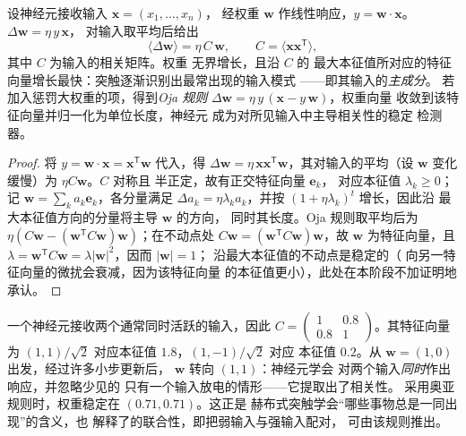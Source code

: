 \begin{theorem}[赫布突触学到什么]\label{thm:b3:learning-memory:hebb}
设神经元接收输入 $\mathbf{x} = (x_{1},\dots,x_{n})$，
经权重 $\mathbf{w}$ 作线性响应，$y = \mathbf{w}\cdot\mathbf{x}$。
 $\Delta\mathbf{w} = \eta\, y\,\mathbf{x}$，
对输入取平均后给出
\[
\langle\Delta\mathbf{w}\rangle = \eta\,C\,\mathbf{w}, \qquad C =
\langle\mathbf{x}\mathbf{x}^{\mathsf{T}}\rangle ,
\]
其中 $C$ 为输入的相关矩阵。权重
无界增长，且沿 $C$ 的
最大本征值所对应的特征向量增长最快：突触逐渐识别出最常出现的输入模式
——即其输入的\emph{主成分}。
若加入惩罚大权重的项，得到\emph{Oja 规则}
$\Delta\mathbf{w} = \eta\, y\,(\mathbf{x} - y\,\mathbf{w})$，权重向量
收敛到该特征向量并归一化为单位长度，神经元
成为对所见输入中主导相关性的稳定
检测器。
\end{theorem}
\begin{proof}
将 $y = \mathbf{w}\cdot\mathbf{x} = \mathbf{x}^{\mathsf{T}}
\mathbf{w}$ 代入，得 $\Delta\mathbf{w} = \eta\,\mathbf{x}
\mathbf{x}^{\mathsf{T}}\mathbf{w}$，其对输入的平均（设
$\mathbf{w}$ 变化缓慢）为 $\eta C\mathbf{w}$。$C$ 对称且
半正定，故有正交特征向量 $\mathbf{e}_{k}$，
对应本征值 $\lambda_{k} \ge 0$；记 $\mathbf{w} = \sum_{k}
a_{k}\mathbf{e}_{k}$，各分量满足 $\Delta a_{k} = \eta\lambda_{k}
a_{k}$，并按 $(1 + \eta\lambda_{k})^{t}$ 增长，因此沿
最大本征值方向的分量将主导 $\mathbf{w}$ 的方向，
同时其长度。Oja 规则取平均后为 $\eta(C\mathbf{w} -
(\mathbf{w}^{\mathsf{T}}C\mathbf{w})\mathbf{w})$；在不动点处
$C\mathbf{w} = (\mathbf{w}^{\mathsf{T}}C\mathbf{w})\mathbf{w}$，故
$\mathbf{w}$ 为特征向量，且 $\lambda = \mathbf{w}^{\mathsf{T}}
C\mathbf{w} = \lambda|\mathbf{w}|^{2}$，因而 $|\mathbf{w}| = 1$；
沿最大本征值的不动点是稳定的（
向另一特征向量的微扰会衰减，因为该特征向量
的本征值更小），此处在本阶段不加证明地承认。
\end{proof}

\begin{example}[两个输入]\label{ex:b3:learning-memory:two-inputs}
一个神经元接收两个通常同时活跃的输入，因此 $C =
\begin{pmatrix} 1 & 0.8 \\ 0.8 & 1\end{pmatrix}$。其特征向量为
$(1,1)/\sqrt{2}$ 对应本征值 $1.8$，$(1,-1)/\sqrt{2}$ 对应
本征值 $0.2$。从 $\mathbf{w} = (1, 0)$ 出发，经过许多小步更新后，
$\mathbf{w}$ 转向 $(1,1)$：神经元学会
对两个输入\emph{同时}作出响应，并忽略少见的
只有一个输入放电的情形——它提取出了相关性。
采用奥亚规则时，权重稳定在 $(0.71, 0.71)$。这正是
赫布式突触学会“哪些事物总是一同出现”的含义，也
解释了的联合性，即把弱输入与强输入配对，
可由该规则推出。
\end{example}

